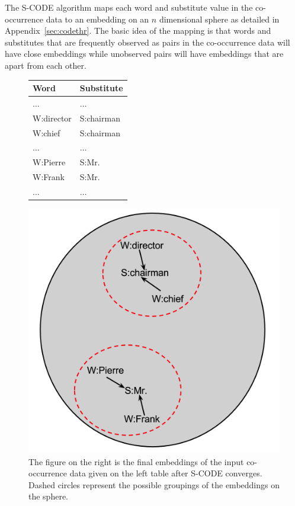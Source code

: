 The S-CODE algorithm maps each word and substitute value in the
co-occurrence data to an embedding on an $n$ dimensional sphere as
detailed in Appendix~\ref{sec:codethr}.  The basic idea of the mapping
is that words and substitutes that are frequently observed as pairs in
the co-occurrence data will have close embeddings while unobserved
pairs will have embeddings that are apart from each other.
\begin{figure}[ht]
\centering
  \begin{minipage}[c]{0.38\textwidth}
    \begin{tabular}{|l|l|}
    \hline
    \textbf{Word} & \textbf{Substitute} \\
    \hline
    $\hdots$&$\hdots$\\
    W:director & S:chairman \\
    W:chief & S:chairman \\
    $\hdots$&$\hdots$\\
    W:Pierre & S:Mr. \\
    W:Frank & S:Mr. \\
    $\hdots$&$\hdots$\\
    \hline
  \end{tabular}
  \end{minipage}
  \begin{minipage}[c]{0.48\textwidth}
    \includegraphics[height=\textwidth]{scode-ex.png}
  \end{minipage}
  \caption{The figure on the right is the final embeddings of the
    input co-occurrence data given on the left table after S-CODE
    converges.  Dashed circles represent the possible groupings of the
    embeddings on the sphere.}
  \label{fig:scodeexample}
\end{figure}

